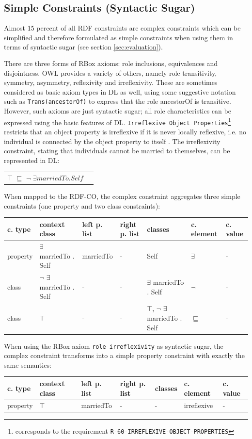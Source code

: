 \documentclass{llncs}
\newcommand{\ms}[1]{\texttt{#1}}
\newenvironment{gcotable}{
  \scriptsize
  \sffamily
  \vspace{0cm}
	\begin{center}
  \begin{tabular}{l|l|l|l|l|l|l}
  \hline
  \textbf{c. type} & \textbf{context class} & \textbf{left p. list} & \textbf{right p. list} & \textbf{classes} & \textbf{c. element} & \textbf{c. value} \\
  \hline

}{
  \hline
  \end{tabular}
	\end{center}
}
\newenvironment{DL}{
  \vspace{0cm}
	\begin{center}
  \begin{tabular}{r l}

}{
  \end{tabular}
	\end{center}
}
\begin{document}
\subsection{Simple Constraints (Syntactic Sugar)}

Almost 15 percent of all RDF constraints are complex constraints which can be simplified and therefore formulated as simple constraints when using them in terms of syntactic sugar (see section \ref{sec:evaluation}).

There are three forms of RBox axioms: role inclusions, equivalences and disjointness. 
OWL provides a variety of others, namely role transitivity, symmetry, asymmetry, reflexivity and irreflexivity. 
These are sometimes considered as basic axiom types in DL as well, using some suggestive notation such as
\ms{Trans(ancestorOf)} to express that the role ancestorOf is transitive. 
However, such axioms are just syntactic sugar; 
all role characteristics can be expressed using the basic features of DL.
\ms{Irreflexive Object Properties}\footnote{corresponds to the requirement \ms{R-60-IRREFLEXIVE-OBJECT-PROPERTIES}}
restricts that an object property is irreflexive if it is never locally reflexive, i.e. no individual is connected by the object property to itself \cite{Kroetzsch2012}.
The irreflexivity constraint, stating that individuals cannot be married to themselves, can be represented in DL:

\begin{DL}
$\top$ $\sqsubseteq$ $\neg$ $\exists  marriedTo . Self$
\end{DL}

When mapped to the RDF-CO, the complex constraint aggregates three simple constraints (one property and two class constraints):

\begin{gcotable}
property & $\exists$ marriedTo . Self & marriedTo & - & Self & $\exists$ & - \\
class & $\neg$ $\exists$ marriedTo . Self & - & - & $\exists$ marriedTo . Self & $\neg$ & - \\
class & $\top$ & - & - & $\top$, $\neg$ $\exists$ marriedTo . Self & $\sqsubseteq$ & - \\
\end{gcotable}

When using the RBox axiom \ms{role irreflexivity} as syntactic sugar, 
the complex constraint transforms into a simple property constraint with exactly the same semantics:

\begin{gcotable}
property & $\top$ & marriedTo & - & - & irreflexive & - \\
\end{gcotable}
\end{document}
